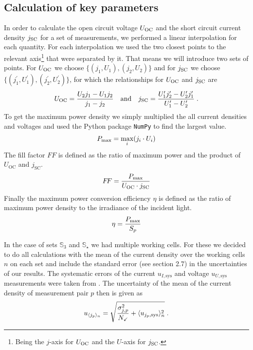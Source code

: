 \subsection{Calculation of key parameters}\label{subsec:calckeyparams}
In order to calculate the open circuit voltage $U_{\text{OC}}$ and the short circuit current density $j_{\text{SC}}$ for a set of measurements, we performed a linear interpolation for each quantity. For each interpolation we used the two closest points to the relevant axis\footnote{Being the $j$-axis for $U_{\text{OC}}$ and the $U$-axis for $j_{\text{SC}}$.} that were separated by it.\mypar
That means we will introduce two sets of points. For $U_{\text{OC}}$ we choose $\{(j_1,U_1),(j_2,U_2)\}$ and for $j_{\text{SC}}$ we choose $\{(j_1^\prime,U_1^\prime),(j_2^\prime,U_2^\prime)\}$, for which the relationships for $U_{\text{OC}}$ and $j_{\text{SC}}$ are
\begin{align}\label{eq:interpol}
U_{\text{OC}} = \frac{U_2 j_1 - U_1 j_2}{j_1-j_2}\quad\text{and}\quad j_{\text{SC}} = \frac{U_1^\prime j_2^\prime - U_2^\prime j_1^\prime}{U_1^\prime-U_2^\prime}\;.
\end{align}
To get the maximum power density we simply multiplied the all current densities and voltages and used the Python package \texttt{NumPy} to find the largest value.
\begin{align}
P_{\text{max}} = \max_{i} (j_i\cdot U_i)
\end{align}
The fill factor $F\!F$ is defined as the ratio of maximum power and the product of $U_{\mathrm{OC}}$ and $j_{\mathrm{SC}}$.
\begin{align}
F\!F = \frac{P_{\text{max}}}{U_{\text{OC}} \cdot j_{\text{SC}}}
\end{align}
Finally the maximum power conversion efficiency $\eta$ is defined as the ratio of maximum power density to the irradiance of the incident light.
\begin{align}
\eta = \frac{P_{\text{max}}}{S_p}
\end{align}

In the case of sets $\mathbb{S}_3$ and $\mathbb{S}_\star$ we had multiple working cells. For these we decided to do all calculations with the mean of the current density over the working cells $n$ on each set and include the standard error (see \cite{measurements} section 2.7) in the uncertainties of our results. The systematic errors of the current $u_{I,\text{sys}}$ and voltage $u_{U,\text{sys}}$ measurements were taken from \cite{keithley}. The uncertainty of the mean of the current density of measurement pair $p$ then is given as
\begin{equation}\label{eq:jerr}
u_{\langle j_p \rangle_n} = \sqrt{\frac{\sigma_{j,p}^2}{N_\checkmark} + \langle u_{j_p,\text{sys}} \rangle_n^2} \;.
\end{equation}

